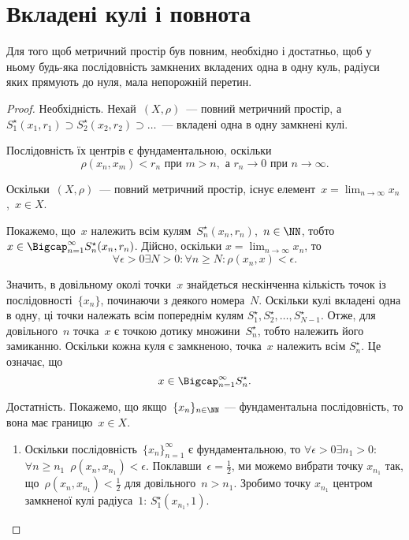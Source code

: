 \section{Вкладені кулі і повнота}

\begin{theorem}
 Для того щоб
метричний простір був повним, необхідно і достатньо, щоб
у ньому будь-яка послідовність замкнених вкладених одна в
одну куль, радіуси яких прямують до нуля, мала непорожній
перетин.
\end{theorem}

\begin{proof}
Необхідність. Нехай~$(X, \rho)$~--- повний
метричний простір, а~$S_1^\star(x_1, r_1) \supset S_2^\star(x_2, r_2) \supset \dots$~--- вкладені
одна в одну замкнені кулі.

Послідовність їх центрів є фундаментальною, оскільки
\begin{equation*}
    \rho(x_n, x_m) < r_n \text{ при } m > n, \text{ а } r_n \to 0 \text{ при } n \to \infty.
\end{equation*}

Оскільки~$(X, \rho)$~--- повний метричний простір, існує
елемент~$x = \lim_{n \to \infty} x_n$,~$x \in X$.

Покажемо, що~$x$ належить всім кулям~$S_n^\star(x_n, r_n)$,~$n \in \NN$,
тобто~$x \in \Bigcap_{n = 1}^\infty S_n^\star(x_n, r_n)$. Дійсно, оскільки
$x = \lim_{n \to \infty} x_n$, то
\begin{equation*}
    \forall \epsilon > 0 \exists N > 0: \forall n \ge N: \rho(x_n, x) < \epsilon.    
\end{equation*}

Значить, в довільному околі точки~$x$ знайдеться
нескінченна кількість точок із послідовності~$\{x_n\}$,
починаючи з деякого номера~$N$. Оскільки кулі вкладені
одна в одну, ці точки належать всім попереднім кулям
$S_1^\star, S_2^\star, \dots, S_{N - 1}^\star$.
Отже, для довільного~$n$ точка~$x$ є точкою
дотику множини~$S_n^\star$, тобто належить його замиканню.
Оскільки кожна куля є замкненою, точка~$x$ належить всім
$S_n^\star$. Це означає, що
\begin{equation*}
    x \in \Bigcap_{n = 1}^\infty S_n^\star.
\end{equation*}

Достатність. Покажемо, що якщо~$\{x_n\}_{n \in \NN}$ ---
фундаментальна послідовність, то вона має границю~$x \in X$.

\begin{enumerate}
\item Оскільки послідовність~$\{x_n\}_{n = 1}^\infty$ є фундаментальною, то
$\forall \epsilon > 0 \exists n_1 > 0$:
$\forall n \ge n_1$~$\rho(x_n, x_{n_1}) < \epsilon$.
Поклавши~$\epsilon = \frac{1}{2}$, ми можемо вибрати точку
$x_{n_1}$ так, що~$\rho(x_n, x_{n_1}) < \frac{1}{2}$ для
довільного~$n > n_1$. Зробимо точку
$x_{n_1}$ центром замкненої кулі радіуса~$1$: 
$S_1^\star(x_{n_1}, 1)$.


\end{enumerate}
\end{proof}
